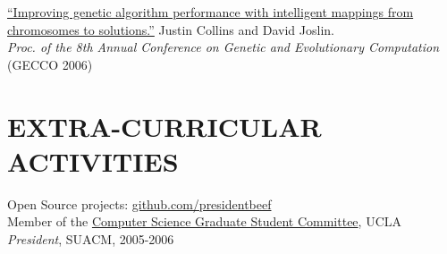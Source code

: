 \documentclass[margin]{res}
\begin{document}
\begin{resume}
		\href{http://cs.ucla.edu/~collins/documents/Collins_Joslin-GECCO06-abstract.pdf}{``Improving genetic algorithm performance with intelligent mappings from chromosomes to solutions.''} Justin Collins and David Joslin. \\
		{\it Proc. of the 8th Annual Conference on Genetic and Evolutionary Computation} (GECCO 2006)

\section{EXTRA-CURRICULAR \\ ACTIVITIES}             
            Open Source projects: \href{http://github.com/presidentbeef}{github.com/presidentbeef}\\
	    Member of the \href{http://csgsc.cs.ucla.edu/}{Computer Science Graduate Student Committee}, UCLA \\
            {\it President}, SUACM, 2005-2006

\end{resume}
\end{document}
